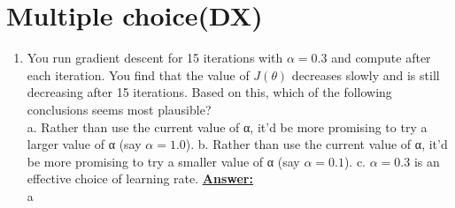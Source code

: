 \documentclass{article}
\newenvironment{qparts}{\begin{enumerate}[1.]}{\end{enumerate}}
\begin{document}
\newpage
\section{Multiple choice(DX)}
\begin{qparts}
\item You run gradient descent for 15 iterations with $\alpha = 0.3$ and compute after each iteration. You find that the value of $J(\theta)$ decreases slowly and is still decreasing after 15 iterations. Based on this, which of the following conclusions seems most plausible?\\
 a. Rather than use the current value of α, it’d be more promising to try a larger value of α (say $\alpha = 1.0$).
 b. Rather than use the current value of α, it’d be more promising to try a smaller value of α (say $\alpha = 0.1$).
 c. $\alpha = 0.3$ is an effective choice of learning rate.
\underline{\textbf{Answer:}}\\
a
\end{qparts}
\end{document}
